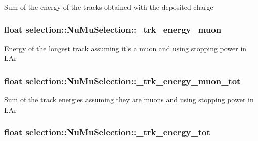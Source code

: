 Sum of the energy of the tracks obtained with the deposited charge \hypertarget{classselection_1_1NuMuSelection_ae223aabae94fb80e1e72b1392ceca16d}{
\subsubsection[{\-\_\-trk\-\_\-energy\-\_\-muon}]{\setlength{\rightskip}{0pt plus 5cm}float selection\-::\-Nu\-Mu\-Selection\-::\-\_\-trk\-\_\-energy\-\_\-muon\hspace{0.3cm}{\ttfamily [private]}}}\label{classselection_1_1NuMuSelection_ae223aabae94fb80e1e72b1392ceca16d}
Energy of the longest track assuming it's a muon and using stopping power in L\-Ar \hypertarget{classselection_1_1NuMuSelection_a09df11b06bf52eef27b8c748707ad991}{
\subsubsection[{\-\_\-trk\-\_\-energy\-\_\-muon\-\_\-tot}]{\setlength{\rightskip}{0pt plus 5cm}float selection\-::\-Nu\-Mu\-Selection\-::\-\_\-trk\-\_\-energy\-\_\-muon\-\_\-tot\hspace{0.3cm}{\ttfamily [private]}}}\label{classselection_1_1NuMuSelection_a09df11b06bf52eef27b8c748707ad991}
Sum of the track energies assuming they are muons and using stopping power in L\-Ar \hypertarget{classselection_1_1NuMuSelection_a62638e6a70986b1b5ae81a3cd80e4dc3}{
\subsubsection[{\-\_\-trk\-\_\-energy\-\_\-tot}]{\setlength{\rightskip}{0pt plus 5cm}float selection\-::\-Nu\-Mu\-Selection\-::\-\_\-trk\-\_\-energy\-\_\-tot\hspace{0.3cm}{\ttfamily [private]}}}\label{classselection_1_1NuMuSelection_a62638e6a70986b1b5ae81a3cd80e4dc3}
